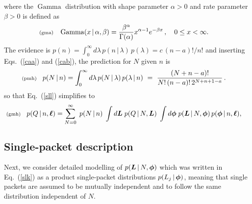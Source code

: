 \documentclass[11pt]{article}
\newcommand{\lleq}[1]{\label{#1} }
\renewcommand{\lleq}[1]{\label{#1} {\scriptstyle {\rm (#1)}} \hspace*{2ex} }
\newcommand{\cond}{\,|\,}
\DeclareMathOperator{\GammaDist}{Gamma}
\begin{document}
where the $\GammaDist$ distribution with shape parameter $\alpha > 0$ and
rate parameter $\beta > 0$ is defined as
\begin{align}
  \lleq{gma}
  \GammaDist(x\cond \alpha, \beta) 
  &= \frac{\beta^\alpha}{\Gamma(\alpha)} x^{\alpha-1} e^{-\beta x}\,,
  \quad 0 \leq x < \infty.
\end{align}
The evidence is 
$p(n) =  \int_0^\infty d\lambda\, p(n\cond\lambda)\,p(\lambda) = c\,(n-a)!/n!$
and inserting Eqs.~(\ref{caa}) and (\ref{cab}), the prediction for $N$
given $n$ is
\begin{align}
  \lleq{pmh}
  p(N\cond n) %
  &= \int_0^\infty d\lambda\, p(N\cond\lambda)\,p(\lambda\cond n)
  \ =\ \frac{(N+n-a)!}{N!\,(n-a)!\,2^{N+n+1-a}} \, .
\end{align}
so that Eq.~(\ref{sll}) simplifies to
\begin{align}
  \lleq{gmh}
  p(Q\cond n,\bml)
  &= \sum_{N=0}^\infty \;
    p(N\cond n)\;
    \int d\bmL\;
    p(Q\cond N,\bmL)\;
    \int d\bmphi\;
    p(\bmL\cond N,\bmphi)\,
    p(\bmphi\cond n,\bml),
\end{align}

\subsection{Single-packet description}

Next, we consider detailed modelling of $p(\bmL\cond N,\bmphi)$ which
was written in Eq.~(\ref{slk}) as a product single-packet
distributions $p(L_j\cond \bmphi)$, meaning that single packets are
assumed to be mutually independent and to follow the same distribution
independent of $N$. 
\end{document}
